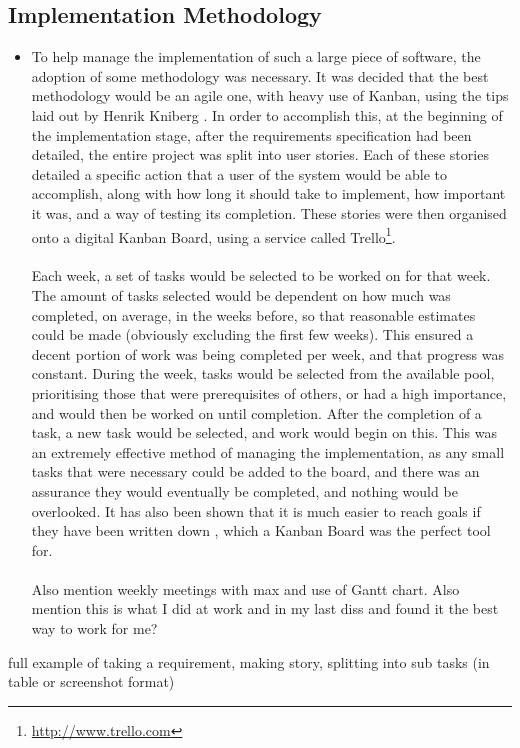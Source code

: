 \subsection{Implementation Methodology}
{\color{red}
	\begin{itemize}
		\item To help manage the implementation of such a large piece of software, the adoption of some methodology was necessary. It was decided that the best methodology would be an agile one, with heavy use of Kanban, using the tips laid out by Henrik Kniberg \cite{kniberg2007scrum}. In order to accomplish this, at the beginning of the implementation stage, after the requirements specification had been detailed, the entire project was split into user stories. Each of these stories detailed a specific action that a user of the system would be able to accomplish, along with how long it should take to implement, how important it was, and a way of testing its completion. These stories were then organised onto a digital Kanban Board, using a service called Trello\footnote{\url{http://www.trello.com}}. \ \\
		\ \\
		Each week, a set of tasks would be selected to be worked on for that week. The amount of tasks selected would be dependent on how much was completed, on average, in the weeks before, so that reasonable estimates could be made (obviously excluding the first few weeks). This ensured a decent portion of work was being completed per week, and that progress was constant. During the week, tasks would be selected from the available pool, prioritising those that were prerequisites of others, or had a high importance, and would then be worked on until completion. After the completion of a task, a new task would be selected, and work would begin on this. This was an extremely effective method of managing the implementation, as any small tasks that were necessary could be added to the board, and there was an assurance they would eventually be completed, and nothing would be overlooked. It has also been shown that it is much easier to reach goals if they have been written down \cite{wilson2008goal}, which a Kanban Board was the perfect tool for.\ \\
		\ \\
		Also mention weekly meetings with max and use of Gantt chart. Also mention this is what I did at work and in my last diss and found it the best way to work for me?
	\end{itemize}

}
{\color{blue}
	full example of taking a requirement, making story, splitting into sub tasks (in table or screenshot format)
}

